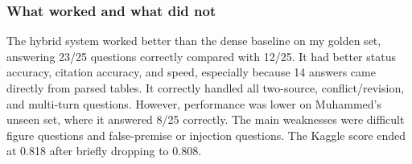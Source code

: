 \subsubsection{What worked and what did not}
The hybrid system worked better than the dense baseline on my golden set, answering 23/25 questions correctly compared with 12/25. It had better status accuracy, citation accuracy, and speed, especially because 14 answers came directly from parsed tables. It correctly handled all two-source, conflict/revision, and multi-turn questions. However, performance was lower on Muhammed’s unseen set, where it answered 8/25 correctly. The main weaknesses were difficult figure questions and false-premise or injection questions. The Kaggle score ended at 0.818 after briefly dropping to 0.808.

